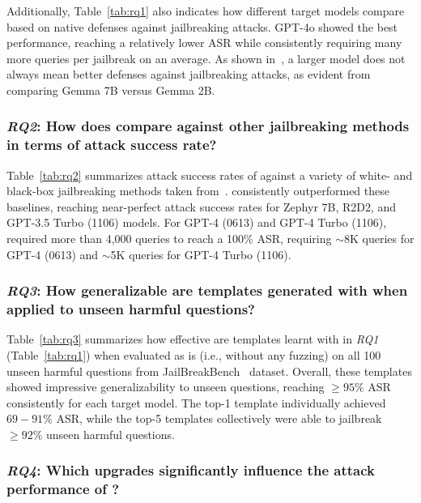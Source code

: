 Additionally, Table~\ref{tab:rq1} also indicates how different target models compare based on native defenses against jailbreaking attacks. GPT-4o showed the best performance, reaching a relatively lower ASR while consistently requiring many more queries per jailbreak on an average. As shown in~\cite{huang2024trustllm}, a larger model does not always mean better defenses against jailbreaking attacks, as evident from comparing Gemma 7B versus Gemma 2B.

\subsubsection*{\textit{RQ2}: How does \bedrockfuzz compare against other jailbreaking methods in terms of attack success rate?}

Table~\ref{tab:rq2} summarizes attack success rates of \bedrockfuzz against a variety of white- and black-box jailbreaking methods taken from~\cite{mazeika2024harmbench}. \bedrockfuzz consistently outperformed these baselines, reaching near-perfect attack success rates for Zephyr 7B, R2D2, and GPT-3.5 Turbo (1106) models. For GPT-4 (0613) and GPT-4 Turbo (1106), \bedrockfuzz required more than 4,000 queries to reach a 100\% ASR, requiring $\sim$8K queries for GPT-4 (0613) and $\sim$5K queries for GPT-4 Turbo (1106).

\subsubsection*{\textit{RQ3}: How generalizable are templates generated with \bedrockfuzz when applied to unseen harmful questions?}
Table~\ref{tab:rq3} summarizes how effective are templates learnt with \bedrockfuzz in \textit{RQ1} (Table~\ref{tab:rq1}) when evaluated as is (i.e., without any fuzzing) on all 100 unseen harmful questions from JailBreakBench~\cite{chao2024jailbreakbench} dataset. Overall, these templates showed impressive generalizability to unseen questions, reaching $\geq 95\%$ ASR consistently for each target model. The top-1 template individually achieved $69-91\%$ ASR, while the top-5 templates collectively were able to jailbreak $\geq 92\%$ unseen harmful questions.


\subsubsection*{\textit{RQ4}: Which upgrades significantly influence the attack performance of \bedrockfuzz?}

